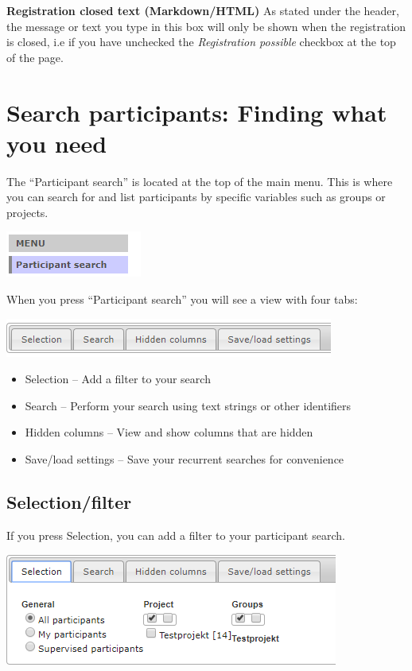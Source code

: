 \documentclass[]{book}
\providecommand{\tightlist}{%
  \setlength{\itemsep}{0pt}\setlength{\parskip}{0pt}}
\begin{document}
\textbf{Registration closed text (Markdown/HTML)}
As stated under the header, the message or text you type in this box will only be shown when the registration is closed, i.e if you have unchecked the \emph{Registration possible} checkbox at the top of the page.

\hypertarget{search-participants-finding-what-you-need}{%
\chapter{Search participants: Finding what you need}\label{search-participants-finding-what-you-need}}

The ``Participant search'' is located at the top of the main menu. This is where you can search for and list participants by specific variables such as groups or projects.

\includegraphics{images/search-participants-menu.png}

When you press ``Participant search'' you will see a view with four tabs:

\includegraphics{images/search-participants-tab.png}

\begin{itemize}
\tightlist
\item
  Selection -- Add a filter to your search
\item
  Search -- Perform your search using text strings or other identifiers
\item
  Hidden columns -- View and show columns that are hidden
\item
  Save/load settings -- Save your recurrent searches for convenience
\end{itemize}

\hypertarget{selectionfilter}{%
\section{Selection/filter}\label{selectionfilter}}

If you press Selection, you can add a filter to your participant search.

\includegraphics{images/selection-filter.png}
\end{document}
